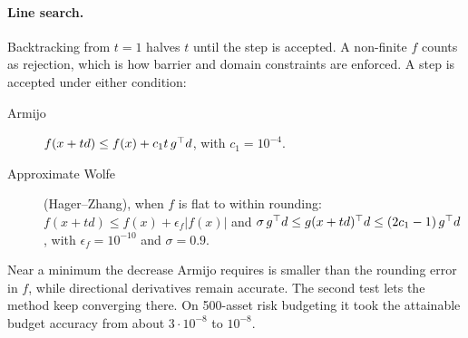 \paragraph{Line search.} Backtracking from $t=1$ halves $t$ until the step is accepted. A
non-finite $f$ counts as rejection, which is how barrier and domain constraints are
enforced. A step is accepted under either condition:
\begin{description}
  \item[Armijo] $f(x+td)\le f(x)+c_1t\,g^\top d$, with $c_1=10^{-4}$.
  \item[Approximate Wolfe] (Hager--Zhang), when $f$ is flat to within rounding:
        $f(x+td)\le f(x)+\epsilon_f|f(x)|$ and
        $\sigma\,g^\top d\le g(x+td)^\top d\le(2c_1-1)\,g^\top d$, with $\epsilon_f=10^{-10}$ and
        $\sigma=0.9$.
\end{description}
Near a minimum the decrease Armijo requires is smaller than the rounding error in $f$,
while directional derivatives remain accurate. The second test lets the method keep
converging there. On 500-asset risk budgeting it took the attainable budget accuracy from
about $3\cdot10^{-8}$ to $10^{-8}$.
\begin{codepointers}
\end{codepointers}

